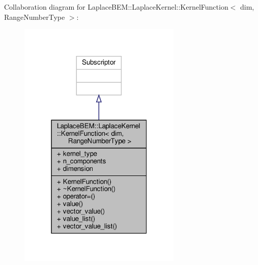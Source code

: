 Collaboration diagram for Laplace\+B\+EM\+:\+:Laplace\+Kernel\+:\+:Kernel\+Function$<$ dim, Range\+Number\+Type $>$\+:\nopagebreak
\begin{figure}[H]
\begin{center}
\leavevmode
\includegraphics[width=220pt]{classLaplaceBEM_1_1LaplaceKernel_1_1KernelFunction__coll__graph}
\end{center}
\end{figure}
